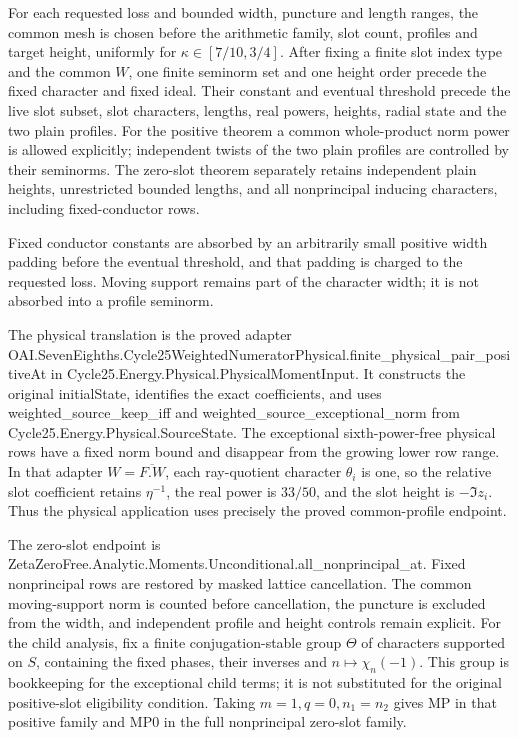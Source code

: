 \documentclass[11pt,a4paper]{article}
\newcommand{\sourcecode}[1]{{\small\ttfamily #1}}
\begin{document}
For each requested loss and bounded width, puncture and length ranges,
the common mesh is chosen before the arithmetic family, slot count,
profiles and target height, uniformly for \(\kappa\in[7/10,\allowbreak{}3/4]\). After
fixing a finite slot index type and the common \(W\), one finite
seminorm set and one height order precede the fixed character and fixed
ideal. Their constant and eventual threshold precede the live slot
subset, slot characters, lengths, real powers, heights, radial state and
the two plain profiles. For the positive theorem a common whole-product
norm power is allowed explicitly; independent twists of the two plain
profiles are controlled by their seminorms. The zero-slot theorem
separately retains independent plain heights, unrestricted bounded
lengths, and all nonprincipal inducing characters, including
fixed-conductor rows.

Fixed conductor constants are absorbed by an arbitrarily small positive
width padding before the eventual threshold, and that padding is charged
to the requested loss. Moving support remains part of the character
width; it is not absorbed into a profile seminorm.

The physical translation is the proved adapter
\sourcecode{OAI.\allowbreak{}Seven\allowbreak{}Eighths.\allowbreak{}Cycle25Weighted\allowbreak{}Numerator\allowbreak{}Physical.\allowbreak{}finite\_\allowbreak{}physical\_\allowbreak{}pair\_\allowbreak{}positive\allowbreak{}At}
in \sourcecode{Cycle25.\allowbreak{}Energy.\allowbreak{}Physical.\allowbreak{}Physical\allowbreak{}Moment\allowbreak{}Input}. It constructs
the original \sourcecode{initial\allowbreak{}State}, identifies the exact coefficients,
and uses \sourcecode{weighted\_\allowbreak{}source\_\allowbreak{}keep\_\allowbreak{}iff} and
\sourcecode{weighted\_\allowbreak{}source\_\allowbreak{}exceptional\_\allowbreak{}norm} from
\sourcecode{Cycle25.\allowbreak{}Energy.\allowbreak{}Physical.\allowbreak{}Source\allowbreak{}State}. The exceptional
sixth-power-free physical rows have a fixed norm bound and disappear
from the growing lower row range. In that adapter \(W=\overline{F.W}\),
each ray-quotient character \(\theta_i\) is one, so the relative slot
coefficient retains \(\eta^{-1}\), the real power is \(33/50\), and the
slot height is \(-\Im z_i\). Thus the physical application uses
precisely the proved common-profile endpoint.

The zero-slot endpoint is
\sourcecode{Zeta\allowbreak{}Zero\allowbreak{}Free.\allowbreak{}Analytic.\allowbreak{}Moments.\allowbreak{}Unconditional.\allowbreak{}all\_\allowbreak{}nonprincipal\_\allowbreak{}at}.
Fixed nonprincipal rows are restored by masked lattice cancellation. The
common moving-support norm is counted before cancellation, the puncture
is excluded from the width, and independent profile and height controls
remain explicit. For the child analysis, fix a finite conjugation-stable
group \(\Theta\) of characters supported on \(S\), containing the fixed
phases, their inverses and \(n\mapsto\chi_n(-1)\). This group is
bookkeeping for the exceptional child terms; it is not substituted for
the original positive-slot eligibility condition. Taking
\(m=1,\allowbreak{}q=0,\allowbreak{}n_1=n_2\) gives MP in that positive family and MP0 in the full
nonprincipal zero-slot family.
\end{document}
